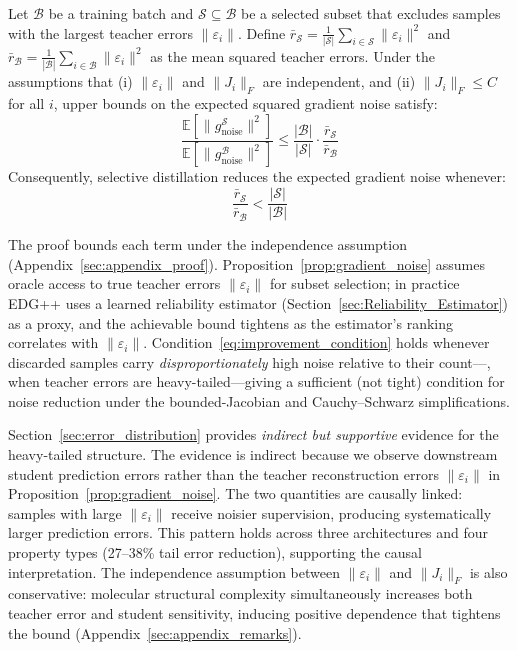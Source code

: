 \begin{proposition}
\label{prop:gradient_noise}
Let $\mathcal{B}$ be a training batch and $\mathcal{S} \subseteq \mathcal{B}$ be a selected subset that excludes samples with the largest teacher errors $\|\varepsilon_i\|$. Define $\bar{r}_{\mathcal{S}} = \frac{1}{|\mathcal{S}|}\sum_{i \in \mathcal{S}} \|\varepsilon_i\|^2$ and $\bar{r}_{\mathcal{B}} = \frac{1}{|\mathcal{B}|}\sum_{i \in \mathcal{B}} \|\varepsilon_i\|^2$ as the mean squared teacher errors. Under the assumptions that (i) $\|\varepsilon_i\|$ and $\|J_i\|_F$ are independent, and (ii) $\|J_i\|_F \leq C$ for all $i$, upper bounds on the expected squared gradient noise satisfy:
\begin{equation}
\label{eq:noise_ratio}
    \frac{\mathbb{E}\left[\|g^{\mathcal{S}}_{\text{noise}}\|^2\right]}{\mathbb{E}\left[\|g^{\mathcal{B}}_{\text{noise}}\|^2\right]} \leq \frac{|\mathcal{B}|}{|\mathcal{S}|} \cdot \frac{\bar{r}_{\mathcal{S}}}{\bar{r}_{\mathcal{B}}}
\end{equation}
Consequently, selective distillation reduces the expected gradient noise whenever:
\begin{equation}
\label{eq:improvement_condition}
    \frac{\bar{r}_{\mathcal{S}}}{\bar{r}_{\mathcal{B}}} < \frac{|\mathcal{S}|}{|\mathcal{B}|}
\end{equation}
\end{proposition}

The proof bounds each term under the independence assumption (Appendix~\ref{sec:appendix_proof}). Proposition~\ref{prop:gradient_noise} assumes oracle access to true teacher errors $\|\varepsilon_i\|$ for subset selection; in practice EDG++ uses a learned reliability estimator (Section~\ref{sec:Reliability_Estimator}) as a proxy, and the achievable bound tightens as the estimator's ranking correlates with $\|\varepsilon_i\|$. Condition~\eqref{eq:improvement_condition} holds whenever discarded samples carry \emph{disproportionately} high noise relative to their count---\ie, when teacher errors are heavy-tailed---giving a sufficient (not tight) condition for noise reduction under the bounded-Jacobian and Cauchy--Schwarz simplifications.

Section~\ref{sec:error_distribution} provides \emph{indirect but supportive} evidence for the heavy-tailed structure. The evidence is indirect because we observe downstream student prediction errors rather than the teacher reconstruction errors $\|\varepsilon_i\|$ in Proposition~\ref{prop:gradient_noise}. The two quantities are causally linked: samples with large $\|\varepsilon_i\|$ receive noisier supervision, producing systematically larger prediction errors. This pattern holds across three architectures and four property types (27--38\% tail error reduction), supporting the causal interpretation. The independence assumption between $\|\varepsilon_i\|$ and $\|J_i\|_F$ is also conservative: molecular structural complexity simultaneously increases both teacher error and student sensitivity, inducing positive dependence that tightens the bound (Appendix~\ref{sec:appendix_remarks}).

